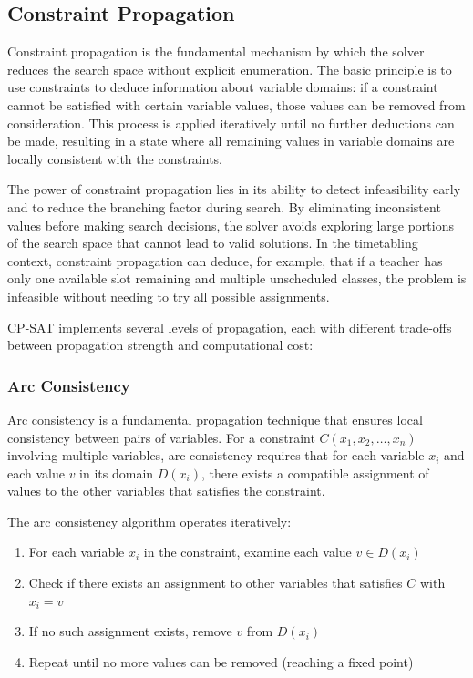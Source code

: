 \documentclass[12pt,a4paper]{article}
\begin{document}
\subsection{Constraint Propagation}

Constraint propagation is the fundamental mechanism by which the solver reduces the search space without explicit enumeration. The basic principle is to use constraints to deduce information about variable domains: if a constraint cannot be satisfied with certain variable values, those values can be removed from consideration. This process is applied iteratively until no further deductions can be made, resulting in a state where all remaining values in variable domains are locally consistent with the constraints.

The power of constraint propagation lies in its ability to detect infeasibility early and to reduce the branching factor during search. By eliminating inconsistent values before making search decisions, the solver avoids exploring large portions of the search space that cannot lead to valid solutions. In the timetabling context, constraint propagation can deduce, for example, that if a teacher has only one available slot remaining and multiple unscheduled classes, the problem is infeasible without needing to try all possible assignments.

CP-SAT implements several levels of propagation, each with different trade-offs between propagation strength and computational cost:

\subsubsection{Arc Consistency}

Arc consistency is a fundamental propagation technique that ensures local consistency between pairs of variables. For a constraint $C(x_1, x_2, \ldots, x_n)$ involving multiple variables, arc consistency requires that for each variable $x_i$ and each value $v$ in its domain $D(x_i)$, there exists a compatible assignment of values to the other variables that satisfies the constraint.

The arc consistency algorithm operates iteratively:
\begin{enumerate}
    \item For each variable $x_i$ in the constraint, examine each value $v \in D(x_i)$
    \item Check if there exists an assignment to other variables that satisfies $C$ with $x_i = v$
    \item If no such assignment exists, remove $v$ from $D(x_i)$
    \item Repeat until no more values can be removed (reaching a fixed point)
\end{enumerate}
\end{document}
